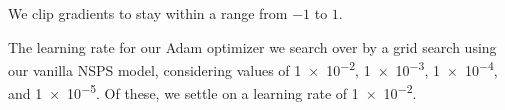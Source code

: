\documentclass{article}
\begin{document}
We clip gradients to stay within a range from $-1$ to $1$.




The learning rate for our Adam optimizer we search over
by a grid search using our vanilla NSPS model, considering
values of \num{1e-2}, \num{1e-3}, \num{1e-4}, and \num{1e-5}.
Of these, we settle on a learning rate of \num{1e-2}.
\end{document}
